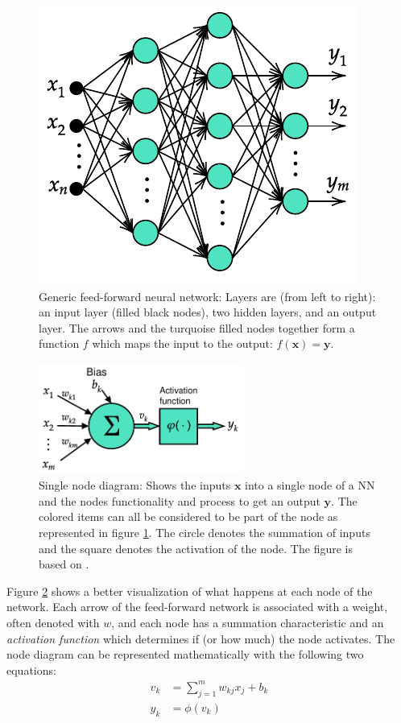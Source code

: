 \begin{figure}[ht]
    \centering
    \includegraphics{img/generic-ann-diagram}
    \caption{Generic feed-forward neural network: Layers are (from left to right): an input layer (filled black nodes), two hidden layers, and an output layer. The arrows and the turquoise filled nodes together form a function $f$ which maps the input to the output: $f(\mathbf{x})=\mathbf{y} $.}
    \label{fig:generic-ann}
\end{figure}

\begin{figure}[ht!]
    \centering
    \includegraphics[width=0.6\textwidth]{img/node-diagram}
    \caption{Single node diagram: Shows the inputs $\mathbf{x}$ into a single node of a \ac{NN} and the nodes functionality and process to get an output $\mathbf{y}$. The colored items can all be considered to be part of the node as represented in figure \ref{fig:generic-ann}. The circle denotes the summation of inputs and the square denotes the activation of the node. The figure is based on \cite[Fig. 5]{Haykin2009}.}
    \label{fig:node-diagram}
\end{figure}

Figure \ref{fig:node-diagram} shows a better visualization of what happens at each node of the network.
Each arrow of the feed-forward network is associated with a weight, often denoted with $w$, and each node has a summation characteristic and an \textit{activation function} which determines if (or how much) the node activates.
The node diagram can be represented mathematically with the following two equations:
\begin{align}
    v_k &= \sum_{j=1}^m w_{kj}x_j + b_k \\
    y_k &= \phi (v_k)
\end{align}

